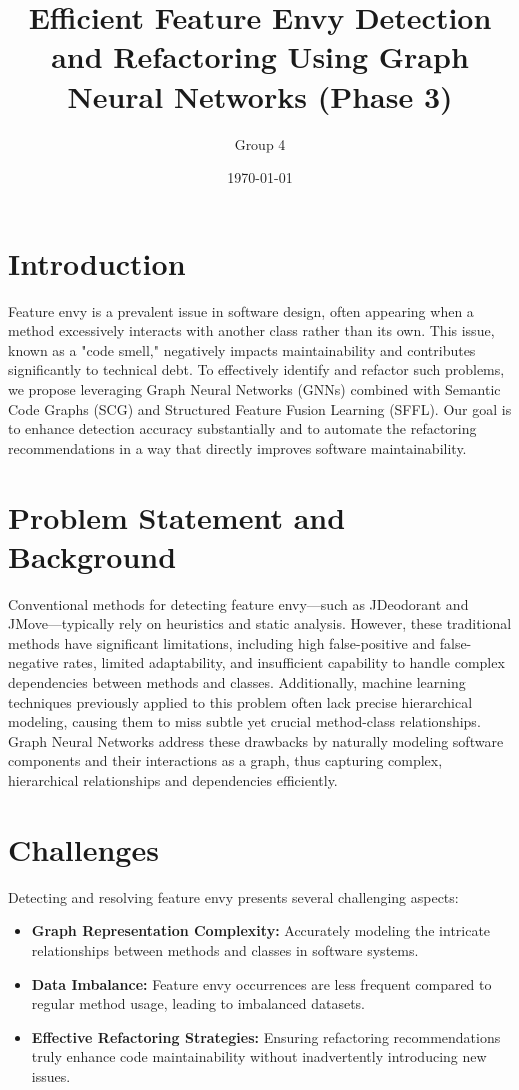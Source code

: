 \documentclass{article}
\title{Efficient Feature Envy Detection and Refactoring Using Graph Neural Networks (Phase 3)}
\author{Group 4}
\date{\today}
\begin{document}
\maketitle

\section{Introduction}
Feature envy is a prevalent issue in software design, often appearing when a method excessively interacts with another class rather than its own. This issue, known as a "code smell," negatively impacts maintainability and contributes significantly to technical debt. To effectively identify and refactor such problems, we propose leveraging Graph Neural Networks (GNNs) combined with Semantic Code Graphs (SCG) and Structured Feature Fusion Learning (SFFL). Our goal is to enhance detection accuracy substantially and to automate the refactoring recommendations in a way that directly improves software maintainability.

\section{Problem Statement and Background}
Conventional methods for detecting feature envy—such as JDeodorant and JMove—typically rely on heuristics and static analysis. However, these traditional methods have significant limitations, including high false-positive and false-negative rates, limited adaptability, and insufficient capability to handle complex dependencies between methods and classes. Additionally, machine learning techniques previously applied to this problem often lack precise hierarchical modeling, causing them to miss subtle yet crucial method-class relationships. Graph Neural Networks address these drawbacks by naturally modeling software components and their interactions as a graph, thus capturing complex, hierarchical relationships and dependencies efficiently.

\section{Challenges}
Detecting and resolving feature envy presents several challenging aspects:
\begin{itemize}
    \item \textbf{Graph Representation Complexity:} Accurately modeling the intricate relationships between methods and classes in software systems.
    \item \textbf{Data Imbalance:} Feature envy occurrences are less frequent compared to regular method usage, leading to imbalanced datasets.
    \item \textbf{Effective Refactoring Strategies:} Ensuring refactoring recommendations truly enhance code maintainability without inadvertently introducing new issues.
\end{itemize}
\end{document}
